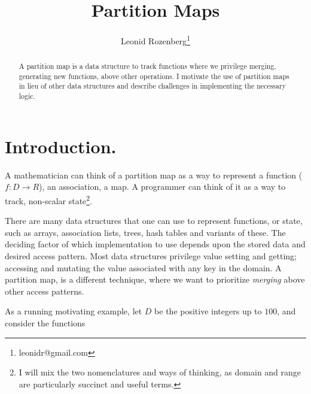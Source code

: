 \documentclass{article}
\begin{document}
\title{Partition Maps}
\author{Leonid Rozenberg\thanks{leonidr@gmail.com}}
\maketitle

\begin{abstract}
  A partition map is a data structure to track functions where we
  privilege merging,
  generating new functions,
  above other operations.
  I motivate the use of partition maps in lieu of other data structures
  and describe challenges in implementing the necessary logic.
\end{abstract}

\section{Introduction.}

A mathematician can think of a partition map as a way to represent a function
($f : D \rightarrow R$), an association, a map.
A programmer can think of it as a way to track, non-scalar
state\footnote{I will mix the two nomenclatures and ways of thinking,
as domain and range are particularly succinct and useful terms.}.

There are many data structures that one can use to represent functions,
or state,
such as arrays, association lists, trees, hash tables and variants of these.
The deciding factor of which implementation to use depends upon the stored
data and desired access pattern.
Most data structures privilege value setting and getting;
accessing and mutating the value associated with any key in the domain.
A partition map, is a different technique, where we want to prioritize
\emph{merging} above other access patterns.

As a running motivating example,
let $D$ be the positive integers up to $100$,
and consider the functions
\end{document}
